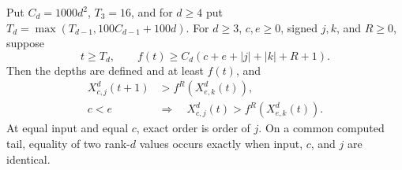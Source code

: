 \begin{lemma}\label{m:lem:uniform}
Put $C_d=1000d^2$, $T_3=16$, and for $d\ge4$ put
$T_d=\max(T_{d-1},100C_{d-1}+100d)$. For $d\ge3$, $c,e\ge0$, signed
$j,k$, and $R\ge0$, suppose
\begin{equation}\label{m:eq:region}
 t\ge T_d,\qquad
 f(t)\ge C_d(c+e+|j|+|k|+R+1).
\end{equation}
Then the depths are defined and at least $f(t)$, and
\begin{align*}
 X^d_{c,j}(t+1)&>f^R(X^d_{e,k}(t)),\\
 c<e\quad&\Longrightarrow\quad
 X^d_{c,j}(t)>f^R(X^d_{e,k}(t)).
\end{align*}
At equal input and equal $c$, exact order is order of $j$. On a common
computed tail, equality of two rank-$d$ values occurs exactly when input,
$c$, and $j$ are identical.
\end{lemma}
